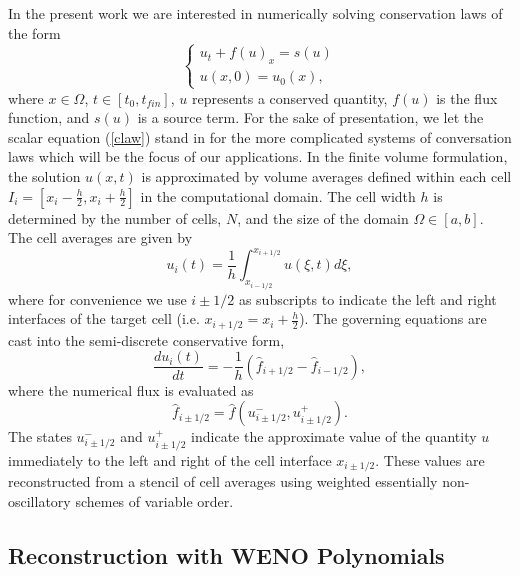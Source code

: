 \documentclass[12pt,letterpaper]{article}
\begin{document}
    In the present work we are interested in numerically solving conservation
    laws of the form
    \begin{equation}
    \begin{cases}
      u_{t} + f(u)_{x} = s(u) \\    
      u(x,0) = u_{0}(x),
    \end{cases}
    \label{claw}
    \end{equation} where $x \in \Omega$, $t \in [t_{0},t_{fin}]$, $u$ represents a conserved quantity, $f(u)$ is the flux
    function, and $s(u)$ is a source term. For the sake of presentation, we let
    the scalar equation (\ref{claw}) stand in for the more complicated systems
    of conversation laws which will be the focus of our applications.  In the
    finite volume formulation, the solution $u(x,t)$ is approximated by volume
    averages defined within each cell $I_{i} = \left[ x_{i}-\frac{h}{2},
    x_{i}+\frac{h}{2} \right]$ in the computational domain.  The cell width $h$
    is determined by the number of cells, $N$, and the size of the domain
    $\Omega \in \left[a,b\right]$.  The cell averages are given by
    \begin{equation}
        u_{i}(t) = \frac{1}{h} \int_{x_{i-1/2}}^{x_{i+1/2}} u(\xi,t) d \xi,
    \end{equation}
    where for convenience we use $i \pm 1/2$ as subscripts to
    indicate the left and right interfaces of the target cell (i.e.
    $x_{i+1/2} =
    x_{i} + \frac{h}{2}$). The governing equations are cast into the
    semi-discrete conservative form,
    \begin{equation}
        \frac{du_{i}(t)}{dt} = -\frac{1}{h} \left( \hat{f}_{i+1/2} -
        \hat{f}_{i-1/2} \right),
        \label{ode}
    \end{equation}
    where the numerical flux is evaluated as
    \begin{equation}
        \hat{f}_{i\pm1/2} = \hat{f}(u^{-}_{i\pm1/2}, u^{+}_{i\pm1/2}).
    \end{equation}
    The states $u^{-}_{i\pm1/2}$ and $u^{+}_{i\pm1/2}$ indicate the approximate
    value of the quantity $u$ immediately to the left and right of the cell
    interface $x_{i\pm1/2}$. These values are reconstructed from a stencil of
    cell averages using weighted essentially non-oscillatory schemes of
    variable order.

    \subsection{Reconstruction with WENO Polynomials}
\end{document}
